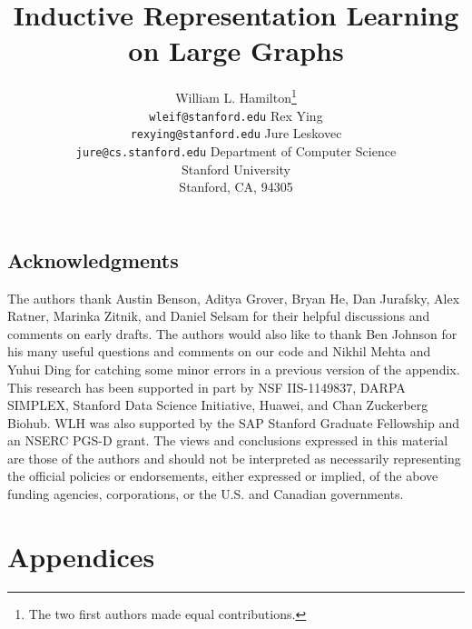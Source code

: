 \documentclass{article}
\title{Inductive Representation Learning on Large Graphs}
\author{
William L. Hamilton\thanks{The two first authors made equal contributions.}\\
\texttt{wleif@stanford.edu}
\And 
Rex Ying\samethanks\\
\texttt{rexying@stanford.edu}
\And 
Jure Leskovec \\
\texttt{jure@cs.stanford.edu}
\vspace{10pt}
\sharedaffiliation
Department of Computer Science\\
Stanford University\\
Stanford, CA, 94305
}
\begin{document}
\maketitle
\setcounter{footnote}{0}

\begin{abstract}

\end{abstract}











\vspace{10pt}
\subsection*{Acknowledgments}
\vspace{-5pt}
The authors thank Austin Benson, Aditya Grover, Bryan He, Dan Jurafsky, Alex Ratner, Marinka Zitnik, and Daniel Selsam for their helpful discussions and comments on early drafts. 
The authors would also like to thank Ben Johnson for his many useful questions and comments on our code and Nikhil Mehta and Yuhui Ding for catching some minor errors in a previous version of the appendix. 
This research has been supported in part by NSF IIS-1149837, DARPA SIMPLEX,
Stanford Data Science Initiative, Huawei, and Chan Zuckerberg Biohub.
WLH was also supported by the SAP Stanford Graduate Fellowship and an NSERC PGS-D grant. 
The views and conclusions expressed in this material are those of the authors
and should not be interpreted as necessarily representing the official policies or endorsements, either expressed or
implied, of the above funding agencies, corporations, or the U.S. and Canadian governments. 
\newpage


\newpage
\section*{{\Large Appendices}}
\appendix

\end{document}
